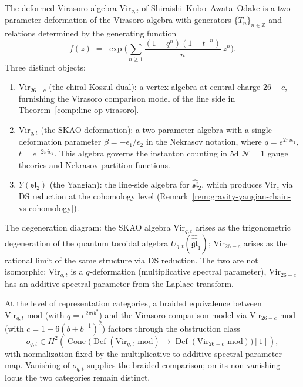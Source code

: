 \begin{remark}
\label{rem:virasoro-skao-comparison}
The deformed Virasoro algebra $\mathrm{Vir}_{q,t}$ of
Shiraishi--Kubo--Awata--Odake is a two-parameter deformation of the
Virasoro algebra with generators $\{T_n\}_{n \in \mathbb{Z}}$ and
relations determined by the generating function
\[
f(z)
\;=\;
\exp\!\Biggl(
\sum_{n \ge 1} \frac{(1-q^n)(1-t^{-n})}{n}\, z^n
\Biggr).
\]
Three distinct objects:
\begin{enumerate}[label=\textup{(\roman*)}]
\item $\mathrm{Vir}_{26-c}$ (the chiral Koszul dual):
 a vertex algebra at central charge $26-c$, furnishing
 the Virasoro comparison model of the line side in
 Theorem~\textup{\ref{comp:line-op-virasoro}}.
\item $\mathrm{Vir}_{q,t}$ (the SKAO deformation):
 a two-parameter algebra with a single deformation
 parameter $\beta = -\epsilon_1/\epsilon_2$ in the
 Nekrasov notation, where $q = e^{2\pi i \epsilon_1}$,
 $t = e^{-2\pi i \epsilon_2}$. This algebra governs
 the instanton counting in 5d $\mathcal{N}=1$ gauge
 theories and Nekrasov partition functions.
\item $Y(\mathfrak{sl}_2)$ (the Yangian):
 the line-side algebra for $\widehat{\mathfrak{sl}}_2$,
 which produces $\mathrm{Vir}_c$ via DS reduction
 at the cohomology level
 (Remark~\ref{rem:gravity-yangian-chain-vs-cohomology}).
\end{enumerate}

The degeneration diagram: the SKAO algebra $\mathrm{Vir}_{q,t}$
arises as the trigonometric degeneration of the quantum toroidal
algebra $U_{q,t}(\widehat{\widehat{\mathfrak{gl}}}_1)$;
$\mathrm{Vir}_{26-c}$ arises as the rational limit of the same
structure via DS reduction. The two are not isomorphic:
$\mathrm{Vir}_{q,t}$ is a $q$-deformation (multiplicative spectral
parameter), $\mathrm{Vir}_{26-c}$ has an additive spectral parameter
from the Laplace transform.

At the level of representation categories, a braided equivalence
between $\mathrm{Vir}_{q,t}\text{-mod}$ (with $q = e^{2\pi i b^2}$)
and the Virasoro comparison model via $\mathrm{Vir}_{26-c}\text{-mod}$
(with $c = 1 + 6(b+b^{-1})^2$) factors through the obstruction class
\[
 o_{q,t}\in
 H^2\!\left(
 \operatorname{Cone}\bigl(
 \operatorname{Def}(\mathrm{Vir}_{q,t}\text{-mod})
 \longrightarrow
 \operatorname{Def}(\mathrm{Vir}_{26-c}\text{-mod})
 \bigr)[1]\right),
\]
with normalization fixed by the multiplicative-to-additive spectral
parameter map. Vanishing of $o_{q,t}$ supplies the braided
comparison; on its non-vanishing locus the two categories remain
distinct.
\end{remark}

